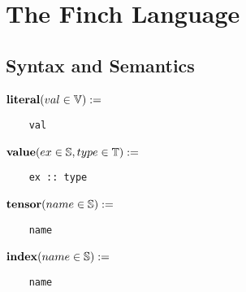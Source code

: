 
\section{The Finch Language}

\subsection{Syntax and Semantics}

\begin{minipage}{0.6\linewidth}
    \noindent\begin{minipage}{.5\linewidth}
    \raggedleft $\text{\textbf{literal}}(val \in \mathbb{V}) :=$~
    \end{minipage}%
    \begin{minipage}{.5\linewidth}
    \begin{verbatim}
    val
    \end{verbatim}
    \end{minipage}

    \noindent\begin{minipage}{.5\linewidth}
    \raggedleft $\text{\textbf{value}}(ex \in \mathbb{S}, type \in \mathbb{T}) :=$~
    \end{minipage}%
    \begin{minipage}{.5\linewidth}
    \begin{verbatim}
    ex :: type
    \end{verbatim}
    \end{minipage}
        
    \noindent\begin{minipage}{.5\linewidth}
    \raggedleft $\text{\textbf{tensor}}(name \in \mathbb{S}) :=$~
    \end{minipage}%
    \begin{minipage}{.5\linewidth}
    \begin{verbatim}
    name
    \end{verbatim}
    \end{minipage}

    \noindent\begin{minipage}{.5\linewidth}
    \raggedleft $\text{\textbf{index}}(name \in \mathbb{S}) :=$~
    \end{minipage}%
    \begin{minipage}{.5\linewidth}
    \begin{verbatim}
    name
    \end{verbatim}
    \end{minipage}


\end{minipage}
